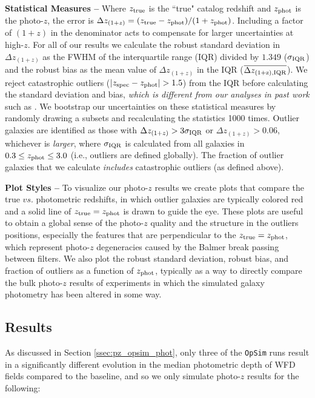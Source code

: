 {\bf Statistical Measures --} Where $z_{\rm true}$ is the ``true" catalog redshift and $z_{\rm phot}$ is the photo-$z$, the error is $\Delta z_{(1+z)} = (z_{\rm true} - z_{\rm phot})/(1+z_{\rm phot})$. Including a factor of $(1+z)$ in the denominator acts to compensate for larger uncertainties at high-$z$. For all of our results we calculate the robust standard deviation in $\Delta z_{(1+z)}$ as the FWHM of the interquartile range (IQR) divided by $1.349$ ($\sigma_{\rm IQR}$) and the robust bias as the mean value of $\Delta z_{(1+z)}$ in the IQR ($\overline{\Delta z_{\rm(1+z), IQR}}$). We reject catastrophic outliers ($|z_{\rm spec}-z_{\rm phot}| > 1.5$) from the IQR before calculating the standard deviation and bias, {\em which is different from our analyses in past work} such as \cite{2018AJ....155....1G}. We bootstrap our uncertainties on these statistical measures by randomly drawing a subsets and recalculating the statistics 1000 times. Outlier galaxies are identified as those with $\Delta z_{(1+z)} > 3\sigma_{\rm IQR}$ or $\Delta z_{(1+z)} > 0.06$, whichever is {\it larger}, where $\sigma_{\rm IQR}$ is calculated from all galaxies in $0.3 \leq z_{\rm phot} \leq 3.0$ (i.e., outliers are defined globally). The fraction of outlier galaxies that we calculate {\it includes} catastrophic outliers (as defined above).

{\bf Plot Styles --} To visualize our photo-$z$ results we create plots that compare the true $vs.$ photometric redshifts, in which outlier galaxies are typically colored red and a solid line of $z_{\rm true} = z_{\rm phot}$ is drawn to guide the eye. These plots are useful to obtain a global sense of the photo-$z$ quality and the structure in the outliers positions, especially the features that are perpendicular to the $z_{\rm true} = z_{\rm phot}$, which represent photo-$z$ degeneracies caused by the Balmer break passing between filters. We also plot the robust standard deviation, robust bias, and fraction of outliers as a function of $z_{\rm phot}$, typically as a way to directly compare the bulk photo-$z$ results of experiments in which the simulated galaxy photometry has been altered in some way. 


\subsection{Results}\label{ssec:pz_results}

As discussed in Section \ref{ssec:pz_opsim_phot}, only three of the {\tt OpSim} runs result in a significantly different evolution in the median photometric depth of WFD fields compared to the baseline, and so we only simulate photo-$z$ results for the following: 

